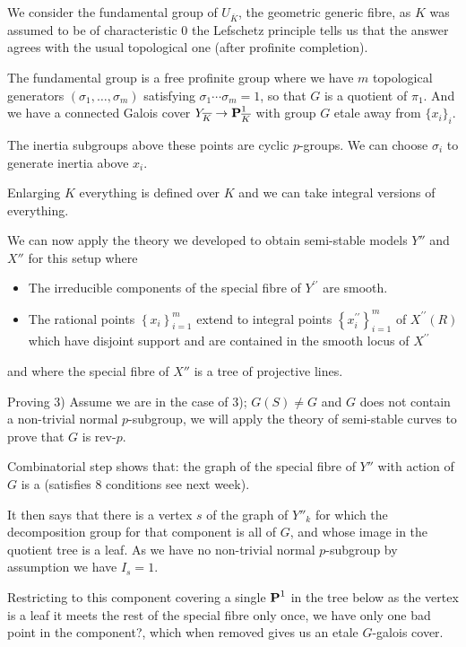 \begin{frame}
    We consider the fundamental group of $U_{\overline K}$, the geometric generic fibre, as $K$ was assumed to be of characteristic $0$ the Lefschetz principle tells us that the answer agrees with the usual topological one (after profinite completion).

    The fundamental group is a free profinite group where we have $m$ topological generators  $(\sigma _1, \ldots, \sigma _m)$ satisfying $\sigma _1 \cdots \sigma _m = 1$, so that $G$ is a quotient of $\pi _1$. And we have a connected Galois cover $Y_{\overline K} \to \operatorname{\mathbf {P}}^1_{\overline K} $ with group $G$ etale away from $\{x_i\}_{i}$.

    The inertia subgroups above these points are cyclic $p$-groups.
    We can choose $\sigma _i$ to generate inertia above $x_i$.

    Enlarging $K$ everything is defined over $K$ and we can take integral versions of everything.
\end{frame}

\begin{frame}
    We can now apply the theory we developed to obtain semi-stable models $Y''$ and $X''$ for this setup where
    \begin{itemize}
        \item The irreducible components of the special fibre of $Y^{\prime \prime}$ are smooth.
        \item The rational points $\left\{x_{i}\right\}_{i=1}^{m}$ extend to integral points $\left\{x_{i}^{\prime \prime}\right\}_{i=1}^{m}$ of $X^{\prime \prime}(R)$ which have disjoint support and are contained in the smooth locus of $X^{\prime \prime}$
    \end{itemize}

    and where the special fibre of $X''$ is a tree of projective lines.
\end{frame}



\begin{frame}{Proving 3)}
    Assume we are in the case of 3); $G(S) \ne G$ and $G$ does not contain a non-trivial normal $p$-subgroup, we will apply the theory of semi-stable curves to prove that $G$ is rev-$p$.

    Combinatorial step shows that: the graph of the special fibre of $Y''$ with action of $G$ is a  (satisfies 8 conditions see next week).

    It then says that there is a vertex $s$ of the graph of $Y''_k$ for which the decomposition group for that component is all of $G$, and whose image in the quotient tree is a leaf.
    As we have no non-trivial normal $p$-subgroup by assumption we have $I_s = 1$.

    Restricting to this component covering a single $\operatorname{\mathbf {P}}^1$ in the tree below as the vertex is a leaf it meets the rest of the special fibre only once, we have only one bad point in the component?, which when removed gives us an etale $G$-galois cover.
\end{frame}

